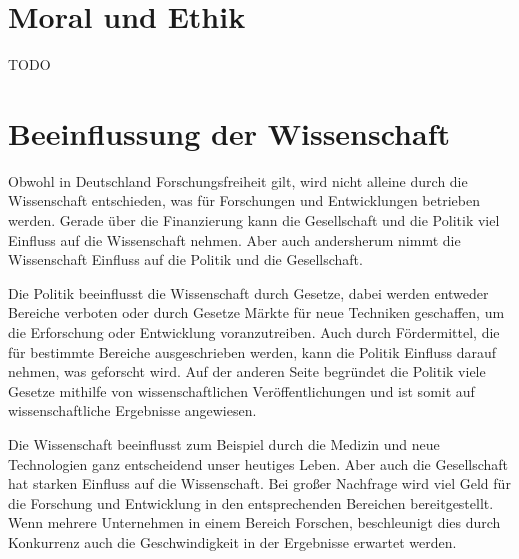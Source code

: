 \documentclass{pmwk}
\begin{document}
\nocite{01,02,03,04,05,06,DeuFunk,forschfoerd,fiff,gvw}


\Abgabeblatt{}{}{}{}




\section*{Moral und Ethik}
TODO

\section*{Beeinflussung der Wissenschaft}
Obwohl in Deutschland Forschungsfreiheit gilt, wird nicht alleine durch die Wissenschaft entschieden, was für Forschungen und Entwicklungen betrieben werden. Gerade über die Finanzierung kann die Gesellschaft und die Politik viel Einfluss auf die Wissenschaft nehmen. Aber auch andersherum nimmt die Wissenschaft Einfluss auf die Politik und die Gesellschaft. \par
Die Politik beeinflusst die Wissenschaft durch Gesetze, dabei werden entweder Bereiche verboten oder durch Gesetze Märkte für neue Techniken geschaffen, um die Erforschung oder Entwicklung voranzutreiben. Auch durch Fördermittel, die für bestimmte Bereiche ausgeschrieben werden, kann die Politik Einfluss darauf nehmen, was geforscht wird. Auf der anderen Seite begründet die Politik viele Gesetze mithilfe von wissenschaftlichen Veröffentlichungen und ist somit auf wissenschaftliche Ergebnisse angewiesen. \par
Die Wissenschaft beeinflusst zum Beispiel durch die Medizin und neue Technologien ganz entscheidend unser heutiges Leben. Aber auch die Gesellschaft hat starken Einfluss auf die Wissenschaft. Bei großer Nachfrage wird viel Geld für die Forschung und Entwicklung in den entsprechenden Bereichen bereitgestellt. Wenn mehrere Unternehmen in einem Bereich Forschen, beschleunigt dies durch Konkurrenz auch die Geschwindigkeit in der Ergebnisse erwartet werden. 
\end{document}

